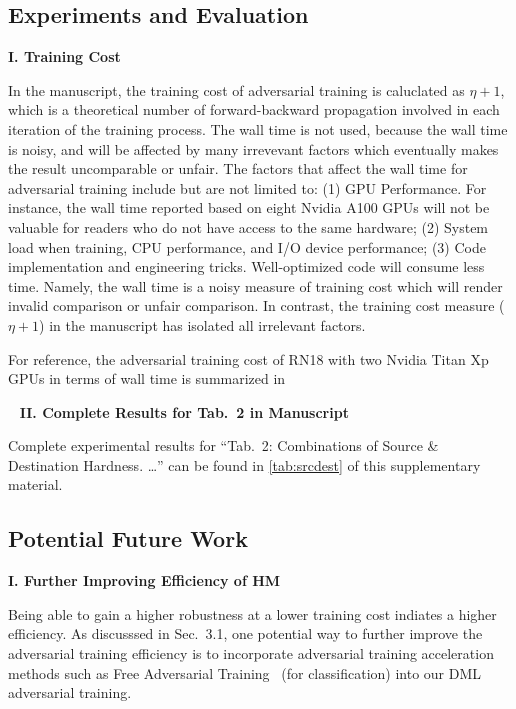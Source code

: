 \subsection{Experiments and Evaluation}

\noindent\textbf{I. Training Cost}

In the manuscript, the training cost of adversarial training is caluclated as
$\eta+1$, which is a theoretical number of forward-backward propagation
involved in each iteration of the training process.
%
The wall time is not used, because the wall time is noisy, and will be affected
by many irrevevant factors which eventually makes the result uncomparable or
unfair.
%
The factors that affect the wall time for adversarial training include but are
not limited to:
%
(1) GPU Performance. For instance, the wall time reported based on eight Nvidia
A100 GPUs will not be valuable for readers who do not have access to the same
hardware;
%
(2) System load when training, CPU performance, and I/O device performance;
%
(3) Code implementation and engineering tricks. Well-optimized code will
consume less time.
%
Namely, the wall time is a noisy measure of training cost which will render
invalid comparison or unfair comparison.
%
In contrast, the training cost measure ($\eta+1$) in the manuscript has
isolated all irrelevant factors.

For reference, the adversarial training cost of RN18 with two Nvidia Titan Xp
GPUs in terms of wall time is summarized in
%

~\newline
\noindent\textbf{II. Complete Results for Tab.~2 in Manuscript}

Complete experimental results for ``Tab.~2: Combinations of Source \&
Destination Hardness. \ldots'' can be found in \cref{tab:srcdest} of this
supplementary material.

\subsection{Potential Future Work}

\noindent\textbf{I. Further Improving Efficiency of HM}

Being able to gain a higher robustness at a lower training cost indiates a
higher efficiency.
%
As discusssed in Sec.~3.1, one potential way to further improve the adversarial
training efficiency is to incorporate adversarial training acceleration methods
such as Free Adversarial Training~\cite{freeat} (for classification) into our
DML adversarial training.

